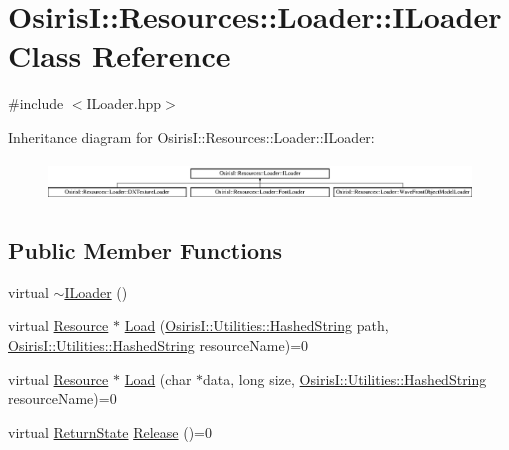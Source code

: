 \hypertarget{class_osiris_i_1_1_resources_1_1_loader_1_1_i_loader}{\section{Osiris\-I\-:\-:Resources\-:\-:Loader\-:\-:I\-Loader Class Reference}
\label{class_osiris_i_1_1_resources_1_1_loader_1_1_i_loader}
}


{\ttfamily \#include $<$I\-Loader.\-hpp$>$}

Inheritance diagram for Osiris\-I\-:\-:Resources\-:\-:Loader\-:\-:I\-Loader\-:\begin{figure}[H]
\begin{center}
\leavevmode
\includegraphics[height=1.072797cm]{class_osiris_i_1_1_resources_1_1_loader_1_1_i_loader}
\end{center}
\end{figure}
\subsection*{Public Member Functions}
\begin{DoxyCompactItemize}
\item 
virtual \hyperlink{class_osiris_i_1_1_resources_1_1_loader_1_1_i_loader_a9ea0dcb14f7a053dd38b31396c675a10}{$\sim$\-I\-Loader} ()
\item 
virtual \hyperlink{class_osiris_i_1_1_resources_1_1_resource}{Resource} $\ast$ \hyperlink{class_osiris_i_1_1_resources_1_1_loader_1_1_i_loader_a21118b7310d51d0dd67485ed13762503}{Load} (\hyperlink{class_osiris_i_1_1_utilities_1_1_hashed_string}{Osiris\-I\-::\-Utilities\-::\-Hashed\-String} path, \hyperlink{class_osiris_i_1_1_utilities_1_1_hashed_string}{Osiris\-I\-::\-Utilities\-::\-Hashed\-String} resource\-Name)=0
\item 
virtual \hyperlink{class_osiris_i_1_1_resources_1_1_resource}{Resource} $\ast$ \hyperlink{class_osiris_i_1_1_resources_1_1_loader_1_1_i_loader_ab19bcbe97db11aec3aed544d72e78778}{Load} (char $\ast$data, long size, \hyperlink{class_osiris_i_1_1_utilities_1_1_hashed_string}{Osiris\-I\-::\-Utilities\-::\-Hashed\-String} resource\-Name)=0
\item 
virtual \hyperlink{namespace_osiris_i_a8f53bf938dc75c65c6a529694514013e}{Return\-State} \hyperlink{class_osiris_i_1_1_resources_1_1_loader_1_1_i_loader_a70cfab0e4b095f8b0611fd929f9daed1}{Release} ()=0
\end{DoxyCompactItemize}


